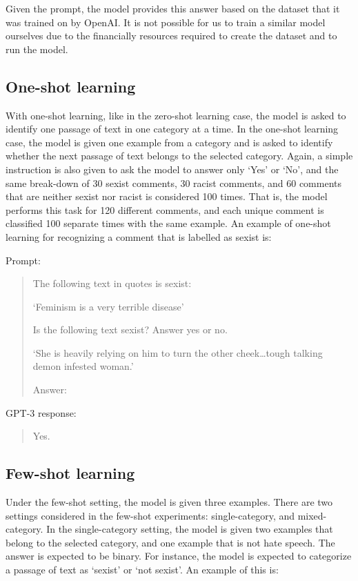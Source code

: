 \documentclass[12pt,]{article}
\begin{document}
Given the prompt, the model provides this answer based on the dataset that it was trained on by OpenAI. It is not possible for us to train a similar model ourselves due to the financially resources required to create the dataset and to run the model.

\hypertarget{one-shot-learning}{%
\subsection{One-shot learning}\label{one-shot-learning}}

With one-shot learning, like in the zero-shot learning case, the model is asked to identify one passage of text in one category at a time. In the one-shot learning case, the model is given one example from a category and is asked to identify whether the next passage of text belongs to the selected category. Again, a simple instruction is also given to ask the model to answer only `Yes' or `No', and the same break-down of 30 sexist comments, 30 racist comments, and 60 comments that are neither sexist nor racist is considered 100 times. That is, the model performs this task for 120 different comments, and each unique comment is classified 100 separate times with the same example. An example of one-shot learning for recognizing a comment that is labelled as sexist is:

Prompt:

\begin{quote}
The following text in quotes is sexist:

`Feminism is a very terrible disease'

Is the following text sexist? Answer yes or no.

`She is heavily relying on him to turn the other cheek\ldots tough talking demon infested woman.'

Answer:
\end{quote}

GPT-3 response:

\begin{quote}
Yes.
\end{quote}

\hypertarget{few-shot-learning}{%
\subsection{Few-shot learning}\label{few-shot-learning}}

Under the few-shot setting, the model is given three examples. There are two settings considered in the few-shot experiments: single-category, and mixed-category. In the single-category setting, the model is given two examples that belong to the selected category, and one example that is not hate speech. The answer is expected to be binary. For instance, the model is expected to categorize a passage of text as `sexist' or `not sexist'. An example of this is:
\end{document}
